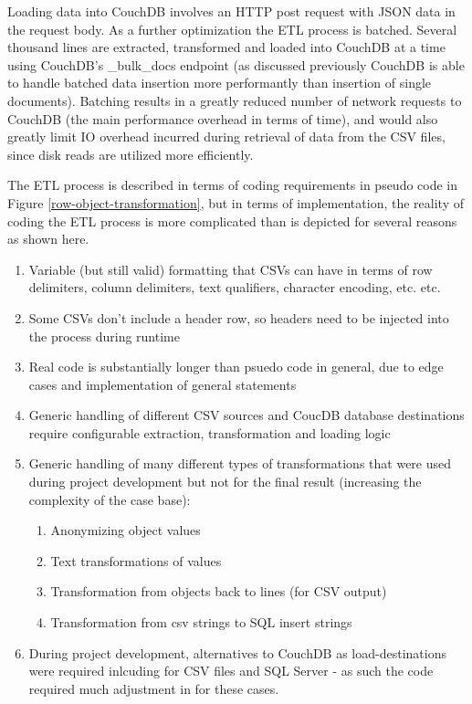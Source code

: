 Loading data into CouchDB involves an HTTP post request with JSON data in the request body. As a further optimization the ETL process is batched. Several thousand lines are extracted, transformed and loaded into CouchDB at a time using CouchDB's \_bulk\_docs endpoint (as discussed previously CouchDB is able to handle batched data insertion more performantly than insertion of single documents). Batching results in a greatly reduced number of network requests to CouchDB (the main performance overhead in terms of time), and would also greatly limit IO overhead incurred during retrieval of data from the CSV files, since disk reads are utilized more efficiently.

The ETL process is described in terms of coding requirements in pseudo code in Figure \ref{row-object-transformation}, but in terms of implementation, the reality of coding the ETL process is more complicated than is depicted for several reasons as shown here.

\begin{enumerate}
    \item Variable (but still valid) formatting that CSVs can have in terms of row delimiters, column delimiters, text qualifiers, character encoding, etc. etc.
    \item Some CSVs don't include a header row, so headers need to be injected into the process during runtime
    \item Real code is substantially longer than psuedo code in general, due to edge cases and implementation of general statements
    \item Generic handling of different CSV sources and CoucDB database destinations require configurable extraction, transformation and loading logic
    \item Generic handling of many different types of transformations that were used during project development but not for the final result (increasing the complexity of the case base):
          \begin{enumerate}
              \item Anonymizing object values
              \item Text transformations of values
              \item Transformation from objects back to lines (for CSV output)
              \item Transformation from csv strings to SQL insert strings
          \end{enumerate}
    \item During project development, alternatives to CouchDB as load-destinations were required inlcuding for CSV files and SQL Server - as such the code required much adjustment in for these cases.
\end{enumerate}

